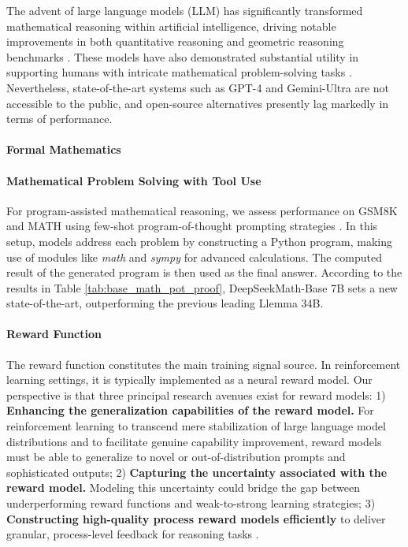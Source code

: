 \begin{itemize}[topsep=0pt]
The advent of large language models (LLM) has significantly transformed mathematical reasoning within artificial intelligence, driving notable improvements in both quantitative reasoning \citep{MATH} and geometric reasoning benchmarks \citep{trinh2024solving}. These models have also demonstrated substantial utility in supporting humans with intricate mathematical problem-solving tasks \citep{tao}. Nevertheless, state-of-the-art systems such as GPT-4 \citep{gpt4} and Gemini-Ultra \citep{gemini} are not accessible to the public, and open-source alternatives presently lag markedly in terms of performance.

\paragraph{Formal Mathematics}

\paragraph{Mathematical Problem Solving with Tool Use} For program-assisted mathematical reasoning, we assess performance on GSM8K and MATH using few-shot program-of-thought prompting strategies \citep{pot,pal}. In this setup, models address each problem by constructing a Python program, making use of modules like \textit{math} and \textit{sympy} for advanced calculations. The computed result of the generated program is then used as the final answer. According to the results in Table \ref{tab:base_math_pot_proof}, DeepSeekMath-Base 7B sets a new state-of-the-art, outperforming the previous leading Llemma 34B.

\paragraph{Reward Function} The reward function constitutes the main training signal source. In reinforcement learning settings, it is typically implemented as a neural reward model. Our perspective is that three principal research avenues exist for reward models: 1) \textbf{Enhancing the generalization capabilities of the reward model.} For reinforcement learning to transcend mere stabilization of large language model distributions and to facilitate genuine capability improvement, reward models must be able to generalize to novel or out-of-distribution prompts and sophisticated outputs; 2) \textbf{Capturing the uncertainty associated with the reward model.} Modeling this uncertainty could bridge the gap between underperforming reward functions and weak-to-strong learning strategies; 3) \textbf{Constructing high-quality process reward models efficiently} to deliver granular, process-level feedback for reasoning tasks \citep{lightman2023let,wang2023math}.


\end{itemize}
